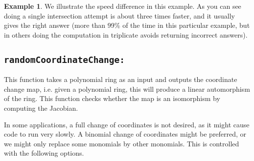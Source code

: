 \documentclass[11pt]{amsart}
\theoremstyle{definition}
\newtheorem{example}{Example}[section]
\begin{document}
\begin{example} We illustrate the speed difference in this example.
	{}
As you can see doing a single intersection attempt is about three times faster, and it usually gives the right answer (more than 99\% of the time in this particular example, but in others doing the computation in triplicate avoids returning incorrect answers).
\end{example}


\subsection*{\tt randomCoordinateChange:} 

This function takes a polynomial ring as an input and outputs the coordinate change map,
i.e. given a polynomial ring, this will produce a linear automorphism of the ring.  This function checks whether the map is an isomorphism by computing the Jacobian.

In some applications, a full change of coordinates is not desired, as it might cause code to run very slowly.  A binomial change of coordinates might be preferred, or we might only replace some monomials by other monomials.  
This is controlled with the following options.
\end{document}
